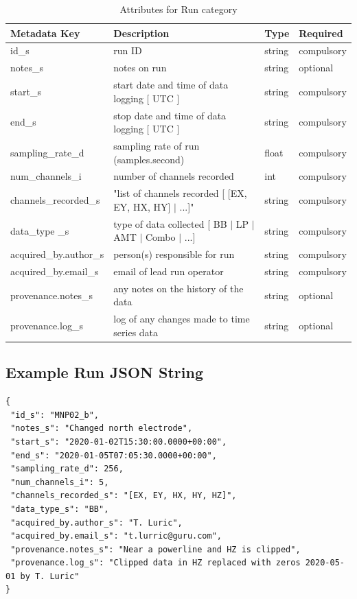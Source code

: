 \documentclass{article}
\begin{document}
\begin{table}[htb!]
	\caption[Attributes for Run]{Attributes for Run category}
	\begin{tabular}{|l|p{3in}|l|l|}
		\hline
		\textbf{Metadata Key} & \textbf{Description} & \textbf{Type} & \textbf{Required} \\ \hline
		id\_s & run ID & string & compulsory \\ \hline
		notes\_s & notes on run & string & optional \\ \hline
		start\_s & start date and time of data logging [ UTC ] & string & compulsory \\ \hline
		end\_s & stop date and time of data logging [ UTC ] & string & compulsory \\ \hline
		sampling\_rate\_d & sampling rate of run (samples.second) & float & compulsory \\ \hline
		num\_channels\_i & number of channels recorded & int & compulsory \\ \hline
		channels\_recorded\_s & "list of channels recorded [ [EX, EY, HX, HY] $|$ ...]" & string & compulsory \\ \hline
		data\_type \_s & type of data collected [ BB $|$ LP $|$ AMT $|$ Combo $|$ ...] & string & compulsory \\ \hline
		acquired\_by.author\_s & person(s) responsible for run & string & compulsory \\ \hline
		acquired\_by.email\_s & email of lead run operator & string & compulsory \\ \hline
		provenance.notes\_s & any notes on the history of the data & string & optional \\ \hline
		provenance.log\_s & log of any changes made to time series data & string & optional \\ \hline
	\end{tabular}
	\label{tab:run}
\end{table}

\subsection{Example Run JSON String}

\begin{verbatim}
{
 "id_s": "MNP02_b",
 "notes_s": "Changed north electrode",
 "start_s": "2020-01-02T15:30:00.0000+00:00",
 "end_s": "2020-01-05T07:05:30.0000+00:00",
 "sampling_rate_d": 256,
 "num_channels_i": 5,
 "channels_recorded_s": "[EX, EY, HX, HY, HZ]",
 "data_type_s": "BB",
 "acquired_by.author_s": "T. Luric",
 "acquired_by.email_s": "t.lurric@guru.com",
 "provenance.notes_s": "Near a powerline and HZ is clipped",
 "provenance.log_s": "Clipped data in HZ replaced with zeros 2020-05-01 by T. Luric"
}
\end{verbatim}
\end{document}
